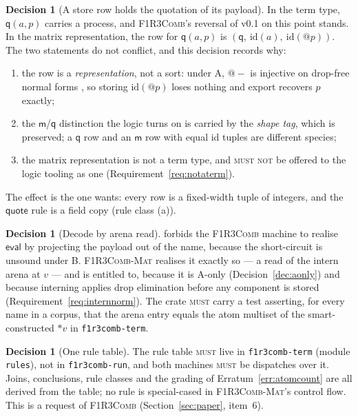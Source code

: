 \documentclass[11pt,a4paper]{article}
\makeatletter
\newcommand{\code}[1]{\texttt{#1}}
\newcommand{\Comb}{\textsc{F1R3Comb}}
\newcommand{\Mat}{\textsc{F1R3Comb-Mat}}
\newcommand{\MUST}{\textsc{must}}
\newcommand{\MUSTNOT}{\textsc{must not}}
\newcommand{\quo}[1]{@#1}
\newcommand{\drp}[1]{{*}#1}
\newcommand{\mm}{\mathsf{m}}
\newcommand{\qq}{\mathsf{q}}
\theoremstyle{definition}
\newtheorem{decision}[definition]{Decision}
\theoremstyle{plain}
\makeatother
\begin{document}
\begin{decision}[A store row holds the quotation of its payload]
\label{dec:qrow}
In the term type, $\qq(a,p)$ carries a process, and \Comb{}'s reversal of
v0.1 on this point \cite[Dec.~4.9, Rem.~4.10]{combspec} stands. In the
matrix representation, the row for $\qq(a,p)$ is $(\qq,\ \mathrm{id}(a),\
\mathrm{id}(\quo{p}))$. The two statements do not conflict, and this decision
records why:
\begin{enumerate}[leftmargin=1.6em]
\item the row is a \emph{representation}, not a sort: under A, $\quo{-}$ is
injective on drop-free normal forms \cite[Prop.~2.10]{logic}, so storing
$\mathrm{id}(\quo{p})$ loses nothing and export recovers $p$ exactly;
\item the $\mm$/$\qq$ distinction the logic turns on \cite[Rem.~2.5]{logic} is
carried by the \emph{shape tag}, which is preserved; a $\qq$ row and an $\mm$
row with equal id tuples are different species;
\item the matrix representation is not a term type, and
\MUSTNOT{} be offered to the logic tooling as one
(Requirement~\ref{req:notaterm}).
\end{enumerate}
The effect is the one \cite[Rem.~3.1]{matnote} wants: every row is a
fixed-width tuple of integers, and the $\mathsf{quote}$ rule is a field copy
(rule class (a)).
\end{decision}

\begin{decision}[Decode by arena read]\label{dec:decode}
\cite[Req.~8.3]{combspec} forbids the \Comb{} machine to realise
$\mathsf{eval}$ by projecting the payload out of the name, because the
short-circuit is unsound under B. \Mat{} realises it exactly so --- a read of
the intern arena at $v$ --- and is entitled to, because it is A-only
(Decision~\ref{dec:aonly}) and because interning applies drop elimination
before any component is stored (Requirement~\ref{req:internnorm}). The crate
\MUST{} carry a test asserting, for every name in a corpus, that the arena
entry equals the atom multiset of the smart-constructed $\drp{v}$ in
\code{f1r3comb-term}.
\end{decision}

\begin{decision}[One rule table]\label{dec:ruletable}
The rule table \cite[Req.~4.7]{combspec} \MUST{} live in \code{f1r3comb-term}
(module \code{rules}), not in \code{f1r3comb-run}, and both machines \MUST{}
be dispatches over it. Joins, conclusions, rule classes and the grading of
Erratum~\ref{err:atomcount} are all derived from the table; no rule is
special-cased in \Mat's control flow. This is a request of \Comb{}
(Section~\ref{sec:paper}, item~6).
\end{decision}
\end{document}
